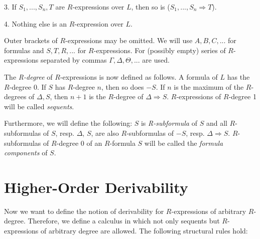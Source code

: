 \documentclass{article}%
\theoremstyle{break}
\begin{document}
3. If $S_1,..., S_n, T$ are $R$-expressions over $L$, then so is ($S_1,..., S_n \Rightarrow T$).

4. Nothing else is an $R$-expression over $L$.

\noindent Outer brackets of $R$-expressions may be omitted.
We will use $A, B, C,...$ for formulas and $S, T, R,...$ for $R$-expressions.
For (possibly empty) series of $R$-expressions separated by commas $\Gamma, \Delta, \Theta, ...$ are used.

\noindent The \emph{R-degree} of $R$-expressions is now defined as follows.
A formula of $L$ has the $R$-degree 0.
If $S$ has $R$-degree $n$, then so does $-S$.
If $n$ is the maximum of the $R$-degrees of $\Delta, S$, then $n+1$ is the $R$-degree of $\Delta \Rightarrow S$.
$R$-expressions of $R$-degree 1 will be called \emph{sequents}. 

Furthermore, we will define the following: $S$ is \emph{R-subformula} of $S$ and all $R$-subformulas of $S$, resp. $\Delta$, $S$, are also $R$-subformulas of $-S$, resp. $\Delta \Rightarrow S$.
$R$-subformulas of $R$-degree 0 of an $R$-formula $S$ will be called the \emph{formula components} of $S$.


\section{Higher-Order Derivability}

Now we want to define the notion of derivability for $R$-expressions of arbitrary $R$-degree.
Therefore, we define a calculus in which not only sequents but $R$-expressions of arbitrary degree are allowed. 
The following structural rules hold:

\begin{center}
\vspace{0.4cm}
\quad {}\hspace{7em} 

\vspace{0.2cm}
\quad{}\hspace{6em} 

\vspace{0.2cm}
\quad {}
\end{center}


\noindent 
\end{document}
